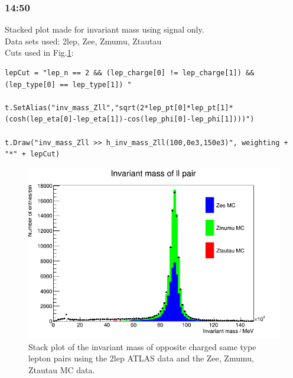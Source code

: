 \subsubsection*{14:50}
Stacked plot made for invariant mass using signal only.
\\
Data sets used: 2lep, Zee, Zmumu, Ztautau
\\
Cuts used in Fig.\ref{fig:14-50_16-02-21}:
\begin{lstlisting}
lepCut = "lep_n == 2 && (lep_charge[0] != lep_charge[1]) && (lep_type[0] == lep_type[1]) "

t.SetAlias("inv_mass_Zll","sqrt(2*lep_pt[0]*lep_pt[1]*(cosh(lep_eta[0]-lep_eta[1])-cos(lep_phi[0]-lep_phi[1])))")
  
t.Draw("inv_mass_Zll >> h_inv_mass_Zll(100,0e3,150e3)", weighting + "*" + lepCut)
\end{lstlisting}
\begin{figure}[h!]
    \centering
	\includegraphics[width=0.85\linewidth]{plots/16-02-2021/14-50_16-02-21.png}
	\caption{Stack plot of the invariant mass of opposite charged same type lepton pairs using the 2lep ATLAS data and the Zee, Zmumu, Ztautau MC data.}
	\label{fig:14-50_16-02-21}
\end{figure}


